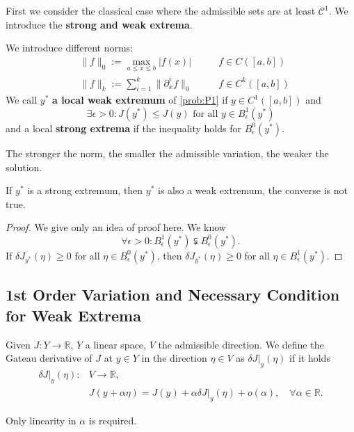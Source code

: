 First we consider the classical case where the admissible sets are at least $\mathcal{C}^1$. We introduce the \textbf{strong and weak extrema}.
\begin{definition}	
We introduce different norms:
\begin{equation}
\begin{aligned}
	& \|f\|_0:= \max_{a \le x \le b} |f(x)| \qquad &f \in C([a, b])\\
	& \|f\|_k:= \sum_{i = 1}^k \|\partial_x^i f\|_0 \quad &f \in C^k([a, b])
\end{aligned}
\end{equation}
	We call $y^*$ \textbf{a local weak extremum} of \eqref{prob:P1} if $y \in C^1([a, b])$ and
	\begin{equation}
		\exists \epsilon > 0: J(y^*) \le J(y) \text{ for all }y \in B_\epsilon^1(y^*)
	\end{equation}
	and a local \textbf{strong extrema} if the inequality holds for $ B_\epsilon^0(y^*)$.
\end{definition}
\begin{remark}
	The stronger the norm, the smaller the admissible variation, the weaker the solution. 
\end{remark}


\begin{proposition}
	If $y^*$ is a strong extremum, then $y^*$ is also a weak extremum, the converse is not true.
\end{proposition}
\begin{proof}
	We give only an idea of proof here. We know
	\begin{equation}
		\forall \epsilon > 0: B_\epsilon^1(y^*) \subsetneqq B^0_\epsilon(y^*).
	\end{equation}
	If $\delta J_{y^*}(\eta) \ge 0$ for all $\eta \in B_\epsilon^0(y^*)$, then $\delta J_{y^*}(\eta) \ge 0$ for all $\eta \in B_\epsilon^1(y^*)$. 
\end{proof}


\subsection{1st Order Variation and Necessary Condition for Weak Extrema}
\begin{definition}
Given $J: Y \rightarrow \mathbb{R} $, $Y$ a linear space, $V$ the admissible direction. We define the Gateau derivative of $J$ at $y \in Y$ in the direction $\eta \in V$ as $\delta J|_y(\eta)$ if it holds
\begin{equation}
\begin{aligned}
	 \delta J|_y(\eta):  & V \rightarrow \mathbb{R},   \\
	& J(y + \alpha \eta) = J(y) + \alpha \delta J|_y(\eta) + o(\alpha), \quad \forall \alpha \in \mathbb{R}.
\end{aligned}
\end{equation} 
\end{definition}
\begin{remark}
Only linearity in $\alpha$ is required. 	
\end{remark}


